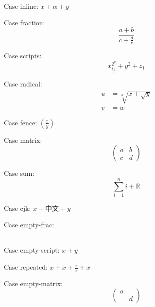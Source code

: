 \documentclass{ctexart}
\begin{document}
Case inline: $x+\alpha+y$

Case fraction: \[\frac{a+b}{c+\frac{d}{e}}\]

Case scripts: \begin{equation}x_{i_j}^{2^{k}}+y^2+z_1\end{equation}

Case radical: \begin{align}u&=\sqrt[3]{x+\sqrt{y}}\\ v&=w\end{align}

Case fence: $\left(\frac{x}{y}\right)$

Case matrix: \[\begin{pmatrix}a&b\\c&d\end{pmatrix}\]

Case sum: \begin{equation}\sum_{i=1}^{n}i+\mathbb{R}\end{equation}

Case cjk: $x+\text{中文}+y$

Case empty-frac: \[\frac{}{}\]

Case empty-script: $x^{}+y_{}$

Case repeated: $x+x+\frac{x}{x}+x$

Case empty-matrix: \[\begin{pmatrix}a&\\&d\end{pmatrix}\]
\end{document}
